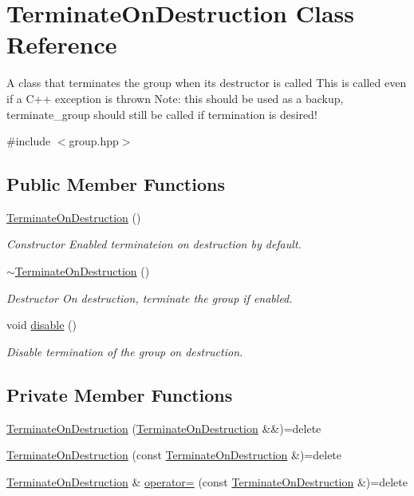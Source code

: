 \hypertarget{class_terminate_on_destruction}{\section{Terminate\-On\-Destruction Class Reference}
\label{class_terminate_on_destruction}
}


A class that terminates the group when its destructor is called This is called even if a C++ exception is thrown Note\-: this should be used as a backup, terminate\-\_\-group should still be called if termination is desired!  




{\ttfamily \#include $<$group.\-hpp$>$}

\subsection*{Public Member Functions}
\begin{DoxyCompactItemize}
\item 
\hyperlink{class_terminate_on_destruction_ac1b230c0858db2e39b83188eae7c5a8e}{Terminate\-On\-Destruction} ()
\begin{DoxyCompactList}\small\item\em Constructor Enabled terminateion on destruction by default. \end{DoxyCompactList}\item 
\hyperlink{class_terminate_on_destruction_a1e2e372004731b788bb9df84d618181f}{$\sim$\-Terminate\-On\-Destruction} ()
\begin{DoxyCompactList}\small\item\em Destructor On destruction, terminate the group if enabled. \end{DoxyCompactList}\item 
void \hyperlink{class_terminate_on_destruction_a3ee7e31e435328d6ff97edd5627f7c27}{disable} ()
\begin{DoxyCompactList}\small\item\em Disable termination of the group on destruction. \end{DoxyCompactList}\end{DoxyCompactItemize}
\subsection*{Private Member Functions}
\begin{DoxyCompactItemize}
\item 
\hyperlink{class_terminate_on_destruction_afbcf618507814357fc16fcf49ac27316}{Terminate\-On\-Destruction} (\hyperlink{class_terminate_on_destruction}{Terminate\-On\-Destruction} \&\&)=delete
\item 
\hyperlink{class_terminate_on_destruction_aaf44815fef9e402548f3fe950bc23a82}{Terminate\-On\-Destruction} (const \hyperlink{class_terminate_on_destruction}{Terminate\-On\-Destruction} \&)=delete
\item 
\hyperlink{class_terminate_on_destruction}{Terminate\-On\-Destruction} \& \hyperlink{class_terminate_on_destruction_aef7320686e582846fd4e30c142feec18}{operator=} (const \hyperlink{class_terminate_on_destruction}{Terminate\-On\-Destruction} \&)=delete
\end{DoxyCompactItemize}
